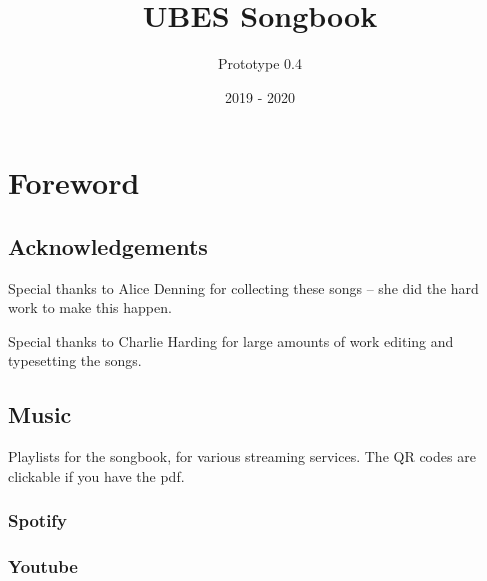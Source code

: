 \documentclass[9pt,twoside]{extarticle}
\title{UBES Songbook}
\author{Prototype 0.4}
\date{2019 - 2020}
\newcommand{\sectionbreak}{\clearpage}
\begin{document}
\raggedbottom
{}

\maketitle
\newpage

\section*{Foreword}

\subsection*{Acknowledgements}

\begin{center}
Special thanks to Alice Denning for collecting these songs -- she did the hard
work to make this happen.

Special thanks to Charlie Harding for large amounts of work editing and
typesetting the songs.
\end{center}

\subsection*{Music}
\begin{center}

Playlists for the songbook, for various streaming services. The QR codes are
clickable if you have the pdf.

\subsubsection*{Spotify}
\quad
{}
\subsubsection*{Youtube}
\quad
{}


\end{center}
\newpage

\tableofcontents

\sectionbreak
{}
\end{document}
